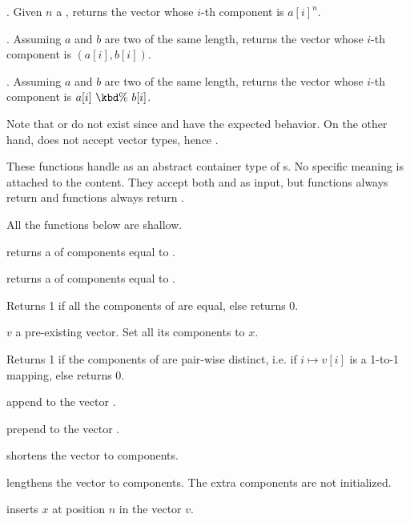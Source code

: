 . Given $n$ a , returns
the vector whose $i$-th component is $a[i]^n$.

. Assuming $a$ and $b$ are two 
of the same length, returns the vector whose $i$-th component
is $(a[i], b[i])$.

. Assuming $a$ and $b$ are two 
of the same length, returns the vector whose $i$-th component
is $a[i]~\kbd{\%}~b[i]$.

Note that  or  do not exist since 
and  have the expected behavior. On the other hand,
 does not accept vector types, hence .


These functions handle  as an abstract container type of
s. No specific meaning is attached to the content. They accept both
 and  as input, but  functions always return
 and  functions always return .

 All the functions below are shallow.

 returns a  of  components
equal to .

 returns a  of  components
equal to .

 Returns 1 if all the components of  are
equal, else returns 0.

 $v$ a pre-existing vector. Set all its
components to $x$.

  Returns 1 if the components of  are
pair-wise distinct, i.e. if $i\mapsto v[i]$ is a 1-to-1 mapping, else returns
0.

 append  to the vector .

 prepend  to the vector .

 shortens the vector  to 
components.

 lengthens the vector 
to  components. The extra components are not initialized.

 inserts $x$ at position $n$ in the vector
$v$.

